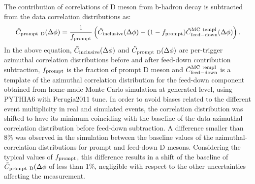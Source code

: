 \begin{comment}
\begin{figure}
\centering
 \caption{Top left: azimuthal correlation distribution between D meson from b-hadron decay and charged particles obtained from a Monte Carlo simulation
based on Pythia (Perugia-0 tune) fitted with a 2+1 Gaussian + constant function. The violet histogram is the template obtained by scaling the baseline
in order to match that measured in data. Top right: data correlation distributions obtained after the subtraction of the feed-down component, using 3 different values of $f_{\rm prompt}$ resulting
from the variation of the charm and beauty quark masses and factorization and renormalization scales employed in the FONLL calculation. Bottom: ratios between the azimuthal
distribution obtained with the maximum and minimum $f_{\rm prompt}$ values and that obtained with the central $f_{\rm prompt}$ value.}
 \label{fig:feeddownDescription}
\end{figure}
\end{comment}
%
%
The contribution of correlations of D meson from b-hadron decay is subtracted from the data correlation distributions as:
\begin{equation}
\tilde{C}_{\rm prompt~D}(\Delta\phi)=\frac{1}{f_{\rm prompt}}\left(\tilde{C}_{\rm inclusive}(\Delta\phi)-(1-f_{\rm prompt})\tilde{C}_{\rm feed-down}^{\rm MC~templ}(\Delta\phi) \right).
\label{eqFeedDown}
\end{equation}
In the above equation, $\tilde{C}_{\rm inclusive}(\Delta\phi)$ and $\tilde{C}_{\rm prompt~D}(\Delta\phi)$ are per-trigger azimuthal correlation distributions before and after
feed-down contribution subtraction, $f_{\rm prompt}$ is the fraction of prompt D meson and $\tilde{C}_{\rm feed-down}^{\rm MC~templ}$ is a template
of the azimuthal correlation distribution for the feed-down component obtained from home-made Monte Carlo simulation at generated level, using PYTHIA6 with Perugia2011 tune. 
In order to avoid biases related to the different event multiplicity in real and simulated events, the correlation distribution was shifted to have its minimum coinciding with the baseline of the data azimuthal-correlation distribution before feed-down subtraction. A difference smaller than 8\% was observed in the simulation between the baseline values of the azimuthal-correlation distributions for prompt and feed-down D mesons. Considering the typical values of $f_{\rm prompt}$, this difference results in a shift of the baseline of $\tilde{C}_{\rm prompt~D}(\Delta\phi$ of less than 1\%, negligible with respect to the other uncertainties affecting the measurement.
